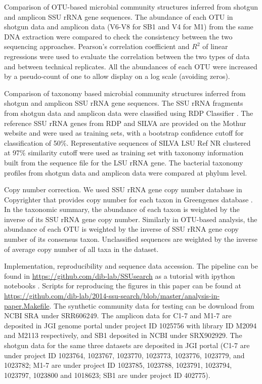\documentclass[]{msu-thesis}
\begin{document}
Comparison of OTU-based microbial community structures inferred from shotgun and amplicon SSU rRNA gene sequences. The abundance of each OTU in shotgun data and amplicon data (V6-V8 for SB1 and V4 for M1) from the same DNA extraction were compared to check the consistency between the two sequencing approaches. Pearson’s correlation coefficient and $R^2$ of linear regressions were used to evaluate the correlation between the two types of data and between technical replicates. All the abundances of each OTU were increased by a pseudo-count of one to allow display on a log scale (avoiding zeros). 

Comparison of taxonomy based microbial community structures inferred from shotgun and amplicon SSU rRNA gene sequences. The SSU rRNA fragments from shotgun data and amplicon data were classified using RDP Classifier \cite{wang_naive_2007}. The reference SSU rRNA genes from RDP and SILVA are provided on the Mothur website and were used as training sets, with a bootstrap confidence cutoff for classification of 50\%. Representative sequences of SILVA LSU Ref NR clustered at 97\% similarity cutoff were used as training set with taxonomy information built from the sequence file for the LSU rRNA gene. The bacterial taxonomy profiles from shotgun data and amplicon data were compared at phylum level.

Copy number correction. We used SSU rRNA gene copy number database in Copyrighter \cite{angly_copyrighter:_2014} that provides copy number for each taxon in Greengenes database \cite{desantis_greengenes_2006}. In the taxonomic summary, the abundance of each taxon is weighted by the inverse of its SSU rRNA gene copy number. Similarly in OTU-based analysis, the abundance of each OTU is weighted by the inverse of SSU rRNA gene copy number of its consensus taxon. Unclassified sequences are weighted by the inverse of average copy number of all taxa in the dataset.

Implementation, reproducibility and sequence data accession. The pipeline can be found in \url{https://github.com/dib-lab/SSUsearch} as a tutorial with ipython notebooks \cite{perez_ipython:_2007}. Scripts for reproducing the figures in this paper can be found at \url{https://github.com/dib-lab/2014-ssu-search/blob/master/analysis-in-paper.Makefile}. The synthetic community data for testing can be download from NCBI SRA under SRR606249. The amplicon data for C1-7 and M1-7 are deposited in JGI genome portal under project ID 1025756 with library ID M2094 and M2113 respectively, and SB1 deposited in NCBI under SRX902929. The shotgun data for the same three datasets are deposited in JGI portal (C1-7 are under project ID 1023764, 1023767, 1023770, 1023773, 1023776, 1023779, and 1023782; M1-7 are under project ID 1023785, 1023788, 1023791, 1023794, 1023797, 1023800 and 1018623; SB1 are under project ID 402775).
\end{document}
